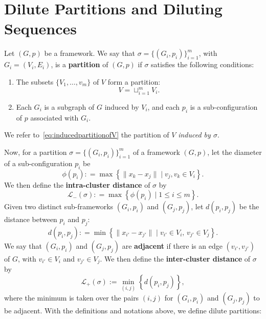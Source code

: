 \documentclass[10pt,twocolumn,twoside]{IEEEtran}
\renewcommand{\cal}{\mathcal}
\renewcommand{\(}{\left (}
\renewcommand{\)}{\right )}
\renewcommand{\;}{\,;\,}
\begin{document}
\section{Dilute Partitions and Diluting Sequences}\label{sec:dp}


 
Let $(G, p)$ be a framework. We say that $\sigma = \{(G_i, p_i)\}^m_{i=1}$, with $G_i = (V_i, E_i)$,  is a {\bf partition} of $(G,p)$ if $\sigma$ satisfies the following conditions: 
\begin{enumerate}
\item The subsets $\{V_1,\ldots,v_m\}$ of $V$ form a partition:  
\begin{equation}\label{eq:inducedpartitionofV}
V = \sqcup^m_{i=1} V_i.
\end{equation}
\item Each  $G_i$ is a subgraph of $G$ induced by $V_i$, and each $p_i$ is a sub-configuration of $p$ associated with $G_i$. 
\end{enumerate}
We refer to~\eqref{eq:inducedpartitionofV} the partition of $V$ {\it induced by $\sigma$}. 

Now, for a partition $\sigma = \{(G_i, p_i)\}^m_{i=1}$ of a framework $(G,p)$,  let the {diameter} of a sub-configuration $p_i$ be 
$$\phi(p_i) : = \max \left \{\| x_k - x_j\| \mid v_j, v_k \in V_i \right\}. $$ 
 We then define the {\bf intra-cluster distance} of $\sigma$ by
\begin{equation}\label{eq:intradistance}
\cal{L}_-(\sigma): = \max\left \{ \phi(p_i) \mid 1\le i \le m  \right\}.
\end{equation}
Given two distinct sub-frameworks $(G_i,p_i)$ and $(G_j, p_j)$, let $d(p_i,p_j)$ be the distance between $p_i$ and $p_j$: 
$$
d(p_i,p_j): = \min\left\{\|x_{i'} - x_{j'}\| \mid  v_{i'} \in V_i, \,  v_{j'} \in V_j \right \}. 
 $$
We say that $(G_i,p_i)$ and $(G_j, p_j)$ are {\bf adjacent} if there is an edge $(v_{i'},v_{j'})$ of $G$, with $v_{i'}\in V_i$ and $v_{j'} \in V_j$.  We then define the {\bf inter-cluster distance} of $\sigma$ by 
\begin{equation}\label{eq:interdistance}
\cal{L}_+(\sigma) := \min_{(i,j)} \left \{ d(p_i,p_j) \right \}, 
\end{equation} 
where the minimum is taken over the pairs $(i,j)$ for $(G_i,p_i)$ and $(G_j,p_j)$ to be adjacent. 
With the definitions and notations above, we define dilute partitions: 
\end{document}
